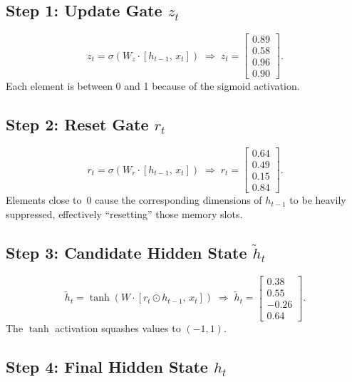 \documentclass[12pt,a4paper]{article}
\begin{document}
\subsection{Step 1: Update Gate $z_t$}

\begin{equation}
  z_t = \sigma(W_z\cdot[h_{t-1},\,x_t])
  \;\Longrightarrow\;
  z_t = \begin{bmatrix} 0.89 \\ 0.58 \\ 0.96 \\ 0.90 \end{bmatrix}.
\end{equation}
Each element is between 0 and 1 because of the sigmoid activation.

\subsection{Step 2: Reset Gate $r_t$}

\begin{equation}
  r_t = \sigma(W_r\cdot[h_{t-1},\,x_t])
  \;\Longrightarrow\;
  r_t = \begin{bmatrix} 0.64 \\ 0.49 \\ 0.15 \\ 0.84 \end{bmatrix}.
\end{equation}
Elements close to~0 cause the corresponding dimensions of $h_{t-1}$ to be heavily suppressed,
effectively ``resetting'' those memory slots.

\subsection{Step 3: Candidate Hidden State $\tilde{h}_t$}

\begin{equation}
  \tilde{h}_t = \tanh(W\cdot[r_t\odot h_{t-1},\,x_t])
  \;\Longrightarrow\;
  \tilde{h}_t = \begin{bmatrix} 0.38 \\ 0.55 \\ -0.26 \\ 0.64 \end{bmatrix}.
\end{equation}
The $\tanh$ activation squashes values to $(-1, 1)$.

\subsection{Step 4: Final Hidden State $h_t$}
\end{document}
